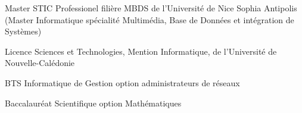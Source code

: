 %
%
%


\begin{scholarship}
	{
		Master STIC Professionel filière MBDS de l'Université de Nice Sophia
		Antipolis (Master Informatique spécialité Multimédia, Base de Données et
		intégration de Systèmes)
	}
	
	{
		Licence Sciences et Technologies, Mention Informatique, de l'Université
		de Nouvelle-Calédonie
	}
	
	{
		BTS Informatique de Gestion option administrateurs de réseaux
	}
	
	{
		Baccalauréat Scientifique option Mathématiques
	}
\end{scholarship}

